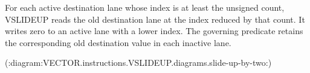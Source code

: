 For each active destination lane whose index is at least the unsigned count,
VSLIDEUP reads the old destination lane at the index reduced by that count.  It
writes zero to an active lane with a lower index.  The governing predicate
retains the corresponding old destination value in each inactive lane.

(:diagram:VECTOR.instructions.VSLIDEUP.diagrams.slide-up-by-two:)
